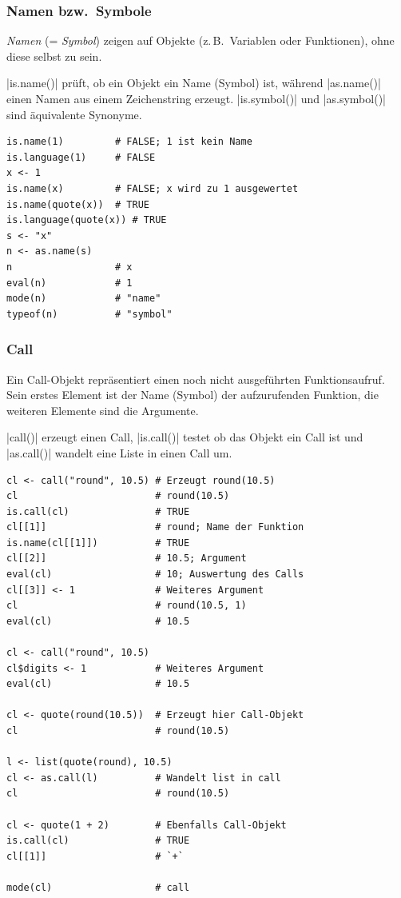 \documentclass[10pt,twocolumn]{scrartcl}
\renewcommand{\lstinline}{\mycoloredinline}
\begin{document}
\subsubsection{Namen bzw.\ Symbole}

\emph{Namen} (= \emph{Symbol}) zeigen auf Objekte (z.\,B.\  Variablen oder Funktionen), ohne diese selbst zu sein.

\lstinline|is.name()| prüft, ob ein Objekt ein Name (Symbol) ist, während \lstinline|as.name()| einen Namen aus einem Zeichenstring erzeugt. \lstinline|is.symbol()| und \lstinline|as.symbol()| sind äquivalente Synonyme.

\begin{lstlisting}
is.name(1)         # FALSE; 1 ist kein Name
is.language(1)     # FALSE
x <- 1
is.name(x)         # FALSE; x wird zu 1 ausgewertet
is.name(quote(x))  # TRUE
is.language(quote(x)) # TRUE
s <- "x"
n <- as.name(s)
n                  # x
eval(n)            # 1
mode(n)            # "name"
typeof(n)          # "symbol"
\end{lstlisting}

\subsubsection{Call}

Ein Call-Objekt repräsentiert einen noch nicht ausgeführten Funktionsaufruf. Sein erstes Element ist der Name (Symbol) der aufzurufenden Funktion, die weiteren Elemente sind die Argumente.

\lstinline|call()| erzeugt einen Call, \lstinline|is.call()| testet ob das Objekt ein Call ist und \lstinline|as.call()| wandelt eine Liste in einen Call um.

\begin{lstlisting}
cl <- call("round", 10.5) # Erzeugt round(10.5)
cl                        # round(10.5)
is.call(cl)               # TRUE
cl[[1]]                   # round; Name der Funktion
is.name(cl[[1]])          # TRUE
cl[[2]]                   # 10.5; Argument
eval(cl)                  # 10; Auswertung des Calls
cl[[3]] <- 1              # Weiteres Argument
cl                        # round(10.5, 1)
eval(cl)                  # 10.5

cl <- call("round", 10.5)
cl$digits <- 1            # Weiteres Argument
eval(cl)                  # 10.5

cl <- quote(round(10.5))  # Erzeugt hier Call-Objekt
cl                        # round(10.5)

l <- list(quote(round), 10.5)
cl <- as.call(l)          # Wandelt list in call
cl                        # round(10.5)

cl <- quote(1 + 2)        # Ebenfalls Call-Objekt
is.call(cl)               # TRUE
cl[[1]]                   # `+`

mode(cl)                  # call
\end{lstlisting}
\end{document}
